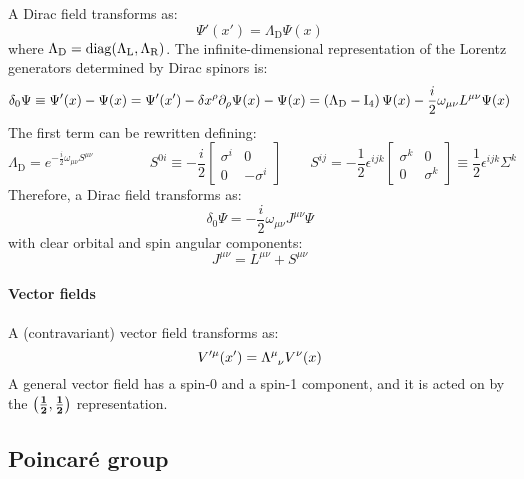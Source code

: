 A Dirac field transforms as:
\begin{equation}
  \Psi'(x') = \Lambda_\text{D} \Psi(x)
\end{equation}
where $ \Lambda_\text{D} = \operatorname{diag}(\Lambda_\text{L} , \Lambda_\text{R}) $. The infinite-dimensional representation of the Lorentz generators determined by Dirac spinors is:
\begin{equation*}
  \delta_0 \Psi \equiv \Psi'(x) - \Psi(x) = \Psi'(x') - \delta x^\rho \partial_\rho \Psi(x) - \Psi(x) = \left( \Lambda_\text{D} - \mathrm{I}_4 \right) \Psi(x) - \frac{i}{2} \omega_{\mu \nu} L^{\mu \nu} \Psi(x)
\end{equation*}
The first term can be rewritten defining:
\begin{equation*}
  \Lambda_\text{D} = e^{-\frac{i}{2} \omega_{\mu \nu} S^{\mu \nu}}
  \qquad \qquad
  S^{0i} \equiv - \frac{i}{2}
  \begin{bmatrix}
    \sigma^i & 0 \\ 0 & -\sigma^i
  \end{bmatrix}
  \qquad
  S^{ij} = - \frac{1}{2} \epsilon^{ijk}
  \begin{bmatrix}
    \sigma^k & 0 \\ 0 & \sigma^k
  \end{bmatrix}
  \equiv \frac{1}{2} \epsilon^{ijk} \Sigma^k
\end{equation*}
Therefore, a Dirac field transforms as:
\begin{equation}
  \delta_0 \Psi = - \frac{i}{2} \omega_{\mu \nu} J^{\mu \nu} \Psi
  \label{eq:dir-field-change}
\end{equation}
with clear orbital and spin angular components:
\begin{equation}
  J^{\mu \nu} = L^{\mu \nu} + S^{\mu \nu}
  \label{eq:dir-field-tot-ang-mom}
\end{equation}

\paragraph{Vector fields}

A (contravariant) vector field transforms as:
\begin{equation}
  V'^\mu(x') = \tensor{\Lambda}{^\mu_\nu} V^\nu(x)
\end{equation}
A general vector field has a spin-0 and a spin-1 component, and it is acted on by the $ \mathbf{\left( \frac{1}{2},\frac{1}{2} \right)} $ representation.

\subsection{Poincaré group}


